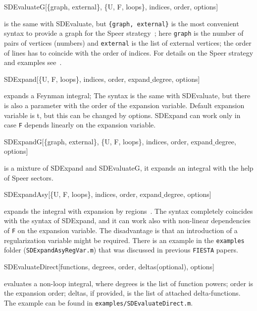 \documentclass[preprint,12pt]{elsarticle}
\newenvironment{code}
  {\tt\noindent\begin{framed}\begin{flushleft}}
  {\end{flushleft}\end{framed}\normalfont}
\begin{document}
\begin{code}
SDEvaluateG[\{graph, external\}, \{U, F, loops\}, indices, order, options] 
\end{code}

\noindent is the same with SDEvaluate, but {\tt \{graph, external\}} is the most convenient syntax to provide a graph for the Speer strategy~\cite{Speer:1968:AR, Smirnov:2008aw};  here {\tt graph} is the number of pairs of vertices (numbers) and {\tt external} is the list of external vertices; the order of lines has to coincide with the order of indices. For details on the Speer strategy and examples see~\cite{Smirnov:2008aw}.

\begin{code}
SDExpand[\{U, F, loops\}, indices, order, expand$\_$degree, options] 
\end{code}

\noindent expands a Feynman integral; The syntax is the same with SDEvaluate, but there is also a parameter with the order of the expansion variable. Default expansion variable is t, but this can be changed by options. SDExpand can work only in case {\tt F} depends linearly on the expansion variable.

\begin{code}
SDExpandG[\{graph, external\}, \{U, F, loops\}, indices, order, expand$\_$degree, options] 
\end{code}

\noindent is a mixture of SDExpand and SDEvaluateG, it expands an integral with the help of Speer sectors.

\begin{code}
SDExpandAsy[\{U, F, loops\}, indices, order, expand$\_$degree, options]
\end{code}

\noindent expands the integral with expansion by regions~\cite{Beneke:1997zp, Smirnov:2002pj, Smirnov:2012gma}. The syntax completely coincides with the syntax of SDExpand, and it can work also with non-linear dependencies of {\tt F} on the expansion variable. The disadvantage is that an introduction of a regularization variable might be required. There is an example in the {\tt examples} folder ({\tt SDExpandAsyRegVar.m}) that was discussed in previous {\tt FIESTA} papers.

\begin{code}
SDEvaluateDirect[functions, degrees, order, deltas(optional), options] 
\end{code}

\noindent evaluates a non-loop integral, where degrees is the list of function powers; order is the expansion order; deltas, if provided, is the list of attached delta-functions. The example can be found in {\tt examples/SDEvaluateDirect.m}.
\end{document}
